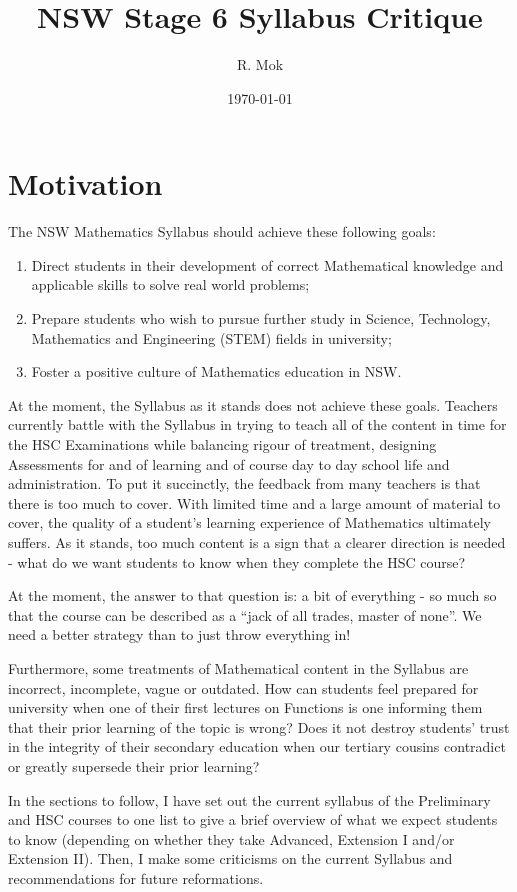 \documentclass[11pt, a4paper, oneside]{article}
\title{NSW Stage 6 Syllabus Critique}
\author{R. Mok
}
\date{\today}
\begin{document}
\maketitle

\section{Motivation}
The NSW Mathematics Syllabus should achieve these following goals:
\begin{enumerate}
  \item Direct students in their development of correct Mathematical knowledge and applicable skills to solve real world problems;
  \item Prepare students who wish to pursue further study in Science, Technology, Mathematics and Engineering (STEM) fields in university;
  \item Foster a positive culture of Mathematics education in NSW.
\end{enumerate}
At the moment, the Syllabus as it stands does not achieve these goals. Teachers currently battle with the Syllabus in trying to teach all of the content in time for the HSC Examinations while balancing rigour of treatment, designing Assessments for and of learning and of course day to day school life and administration. To put it succinctly, the feedback from many teachers is that there is too much to cover. With limited time and a large amount of material to cover, the quality of a student's learning experience of Mathematics ultimately suffers. As it stands, too much content is a sign that a clearer direction is needed - what do we want students to know when they complete the HSC course?

At the moment, the answer to that question is: a bit of everything - so much so that the course can be described as a ``jack of all trades, master of none''. We need a better strategy than to just throw everything in!

Furthermore, some treatments of Mathematical content in the Syllabus are incorrect, incomplete, vague or outdated. How can students feel prepared for university when one of their first lectures on Functions is one informing them that their prior learning of the topic is wrong? Does it not destroy students' trust in the integrity of their secondary education when our tertiary cousins contradict or greatly supersede their prior learning?

In the sections to follow, I have set out the current syllabus of the Preliminary and HSC courses to one list to give a brief overview of what we expect students to know (depending on whether they take Advanced, Extension I and/or Extension II). Then, I make some criticisms on the current Syllabus and recommendations for future reformations.
\end{document}
